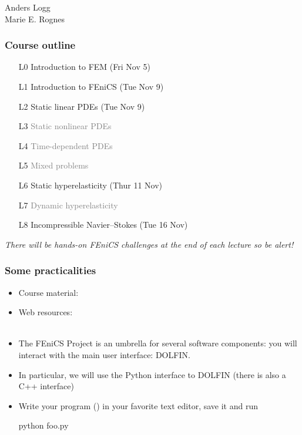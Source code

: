 \documentclass{fenicscourse}
\begin{document}
              {Anders Logg \\
               Marie E. Rognes}

\begin{frame}
  \frametitle{Course outline}

  \begin{enumerate}
  \item[L0]
    Introduction to FEM (Fri Nov 5)
  \item[L1]
    Introduction to FEniCS (Tue Nov 9)
  \item[L2]
    Static linear PDEs (Tue Nov 9)
  \item[L3]
    \textcolor{grey}{Static nonlinear PDEs}
  \item[L4]
    \textcolor{grey}{Time-dependent PDEs}
  \item[L5]
    \textcolor{grey}{Mixed problems}
  \item[L6]
    Static hyperelasticity (Thur 11 Nov)
  \item[L7]
    \textcolor{grey}{Dynamic hyperelasticity}
  \item[L8]
    Incompressible Navier--Stokes (Tue 16 Nov)
  \end{enumerate}

  \bigskip

  \emph{There will be hands-on FEniCS challenges at the end of each
    lecture so be alert!}


\end{frame}

\begin{frame}[fragile]
\frametitle{Some practicalities}

\begin{itemize}
\item Course material: \\
\item Web resources: \\
   \\
\item
  The FEniCS Project is an umbrella for several software components:
  you will interact with the main user interface: DOLFIN.
\item
  In particular, we will use the Python interface to DOLFIN (there is
  also a C++ interface)
\item
  Write your program () in your favorite text editor, save
  it and run
  \vspace{-1em}
  \begin{bash}
python foo.py
  \end{bash}
\end{itemize}

\end{frame}
\end{document}
